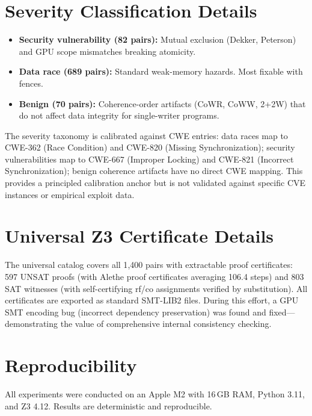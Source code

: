 \documentclass[11pt]{article}
\begin{document}
\section{Severity Classification Details}
\label{app:severity-details}

\begin{itemize}[nosep]
\item \textbf{Security vulnerability (82 pairs):} Mutual exclusion
  (Dekker, Peterson) and GPU scope mismatches breaking atomicity.
\item \textbf{Data race (689 pairs):} Standard weak-memory hazards.
  Most fixable with fences.
\item \textbf{Benign (70 pairs):} Coherence-order artifacts (CoWR, CoWW, 2+2W)
  that do not affect data integrity for single-writer programs.
\end{itemize}

\noindent
The severity taxonomy is calibrated against CWE entries:
data races map to CWE-362 (Race Condition) and CWE-820
(Missing Synchronization); security vulnerabilities map to
CWE-667 (Improper Locking) and CWE-821 (Incorrect Synchronization);
benign coherence artifacts have no direct CWE mapping.
This provides a principled calibration anchor but is not validated
against specific CVE instances or empirical exploit data.

\section{Universal Z3 Certificate Details}
\label{app:universal-cert-details}

The universal catalog covers all 1{,}400 pairs with extractable proof
certificates:
597 UNSAT proofs (with Alethe proof certificates averaging 106.4 steps) and
803 SAT witnesses (with self-certifying rf/co assignments verified by substitution).
All certificates are exported as standard SMT-LIB2 files.
During this effort, a GPU SMT encoding bug (incorrect dependency
preservation) was found and fixed---demonstrating the value of
comprehensive internal consistency checking.

\section{Reproducibility}
\label{app:reproducibility}

All experiments were conducted on an Apple M2 with 16\,GB RAM, Python 3.11,
and Z3 4.12.  Results are deterministic and reproducible.
\end{document}
